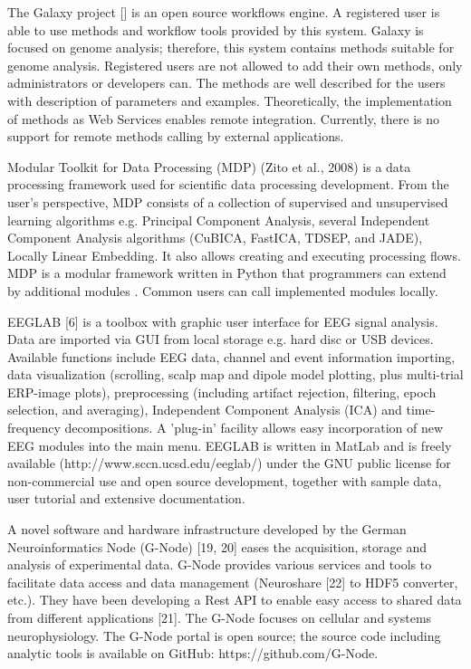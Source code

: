 \documentclass{frontiersSCNS} %
\begin{document}
The Galaxy project [] is an open source workflows engine. A registered user is able to use methods and workflow tools provided by this system. Galaxy is focused on genome analysis; therefore, this system contains methods suitable for genome analysis. Registered users are not allowed to add their own methods, only administrators or developers can. The methods are well described for the users with description of parameters and examples. Theoretically, the implementation of methods as Web Services enables remote integration. Currently, there is no support for remote methods calling by external applications.

Modular Toolkit for Data Processing (MDP) (Zito et al., 2008) is a data processing framework used for scientific data processing development. From the user’s perspective, MDP consists of a collection of supervised and unsupervised learning algorithms e.g. Principal Component Analysis, several Independent Component Analysis algorithms (CuBICA, FastICA, TDSEP, and JADE), Locally Linear Embedding. It also allows creating and executing processing flows. MDP is a modular framework written in Python that programmers can extend by additional modules \cite{MDP12}. Common users can call implemented modules locally.

EEGLAB [6] is a toolbox with graphic user interface for EEG signal analysis. Data are imported via GUI from local storage e.g. hard disc or USB devices. Available functions include EEG data, channel and event information importing, data visualization (scrolling, scalp map and dipole model plotting, plus multi-trial ERP-image plots), preprocessing (including artifact rejection, filtering, epoch selection, and averaging), Independent Component Analysis (ICA) and time-frequency decompositions. A 'plug-in' facility allows easy incorporation of new EEG modules into the main menu. EEGLAB is written in MatLab and is freely available (http://www.sccn.ucsd.edu/eeglab/) under the GNU public license for non-commercial use and open source development, together with sample data, user tutorial and extensive documentation.

A novel software and hardware infrastructure developed by the German Neuroinformatics Node (G-Node) [19, 20] eases the acquisition, storage and analysis of experimental data. G-Node provides various services and tools to facilitate data access and data management (Neuroshare [22] to HDF5 converter, etc.). They have been developing a Rest API to enable easy access to shared data from different applications [21]. The G-Node focuses on cellular and systems neurophysiology. The G-Node portal is open source; the source code including analytic tools is available on GitHub: https://github.com/G-Node.
\end{document}
